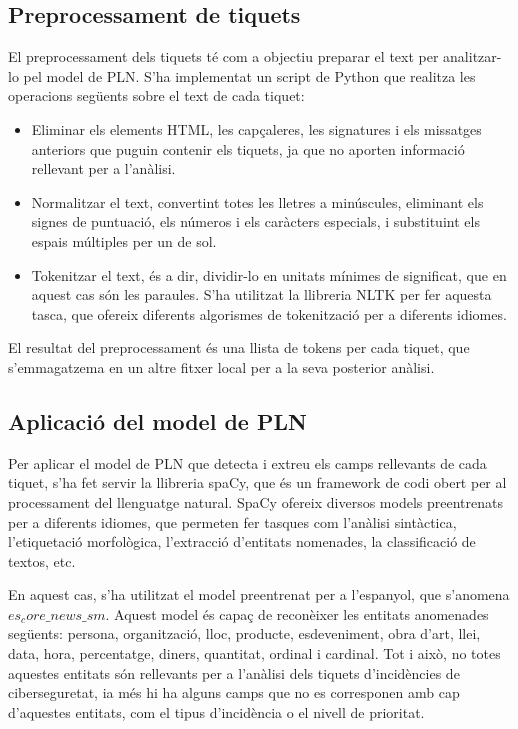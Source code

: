 \subsection{Preprocessament de tiquets}
El preprocessament dels tiquets té com a objectiu preparar el text per analitzar-lo pel model de PLN. S'ha implementat un script de Python que realitza les operacions següents sobre el text de cada tiquet:

\begin{itemize}
     \item Eliminar els elements HTML, les capçaleres, les signatures i els missatges anteriors que puguin contenir els tiquets, ja que no aporten informació rellevant per a l'anàlisi.
     \item Normalitzar el text, convertint totes les lletres a minúscules, eliminant els signes de puntuació, els números i els caràcters especials, i substituint els espais múltiples per un de sol.
     \item Tokenitzar el text, és a dir, dividir-lo en unitats mínimes de significat, que en aquest cas són les paraules. S'ha utilitzat la llibreria NLTK per fer aquesta tasca, que ofereix diferents algorismes de tokenització per a diferents idiomes.
\end{itemize}

El resultat del preprocessament és una llista de tokens per cada tiquet, que s'emmagatzema en un altre fitxer local per a la seva posterior anàlisi.

\subsection{Aplicació del model de PLN}

Per aplicar el model de PLN que detecta i extreu els camps rellevants de cada tiquet, s'ha fet servir la llibreria spaCy, que és un framework de codi obert per al processament del llenguatge natural. SpaCy ofereix diversos models preentrenats per a diferents idiomes, que permeten fer tasques com l'anàlisi sintàctica, l'etiquetació morfològica, l'extracció d'entitats nomenades, la classificació de textos, etc.

En aquest cas, s'ha utilitzat el model preentrenat per a l'espanyol, que s'anomena \\ $es_core\_news\_sm$. Aquest model és capaç de reconèixer les entitats anomenades següents: persona, organització, lloc, producte, esdeveniment, obra d'art, llei, data, hora, percentatge, diners, quantitat, ordinal i cardinal. Tot i això, no totes aquestes entitats són rellevants per a l'anàlisi dels tiquets d'incidències de ciberseguretat, ia més hi ha alguns camps que no es corresponen amb cap d'aquestes entitats, com el tipus d'incidència o el nivell de prioritat.

